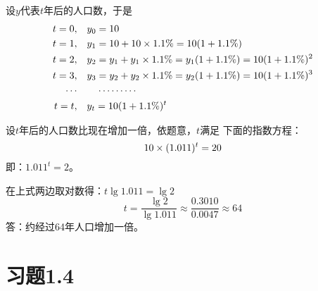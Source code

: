 \begin{solution}
设$y$代表$t$年后的人口数，于是
\[\begin{split}
    t=0,&\quad y_0=10\\
t=1,&\quad y_1=10+10\times1.1\%=10(1+1.1\%)\\
t=2,&\quad y_2=y_1+y_1\times1.1\%=y_1(1+1.1\%)=10(1+1.1\%)^2\\
t=3,&\quad y_3=y_2+y_2\times1.1\%=y_2(1+1.1\%)=10(1+1.1\%)^3\\
\cdots & \qquad \cdots\cdots\cdots\\
t=t,&\quad y_t=10(1+1.1\%)^t
\end{split}\]

设$t$年后的人口数比现在增加一倍，依题意，$t$满足
下面的指数方程：
\[10\times(1.011)^t=20\]
即：$1.011^t=2$。

在上式两边取对数得：$t\lg 1.011=\lg 2$
\[t=\frac{\lg2}{\lg1.011}\approx\frac{0.3010}{0.0047}\approx 64\]
答：约经过64年人口增加一倍。
\end{solution}

\section*{习题1.4}

